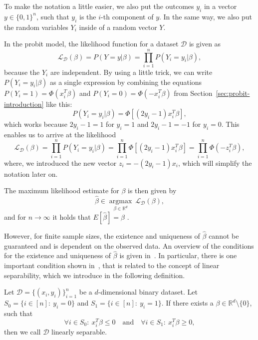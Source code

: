 To make the notation a little easier, we also put the outcomes $y_i$
in a vector $y \in \{0, 1\}^n$, such that $y_i$ is the $i$-th
component of $y$. In the same way, we also put the random
variables $Y_i$ inside of a random vector $Y$.

In the probit model, the likelihood function for a
dataset $\mathcal{D}$ is given as
\begin{equation}
    \label{eq:likelihood}
    \mathcal{L}_\mathcal{D}(\beta) = P(Y=y | \beta) = \prod_{i=1}^n P(Y_i=y_i | \beta),
\end{equation}
because the $Y_i$ are independent. By using a little trick, we can
write $P(Y_i=y_i|\beta)$ as a single expression by combining
the equations $P(Y_i=1) = \Phi(x_i^T \beta)$ and
$P(Y_i=0) = \Phi(-x_i^T \beta)$ from Section~\ref{sec:probit-introduction}
like this:
\begin{equation*}
    P(Y_i = y_i | \beta) = \Phi[(2y_i - 1) x_i^T \beta],
\end{equation*}
which works because $2y_i-1=1$ for $y_i=1$ and $2y_i-1=-1$ for $y_i=0$.
This enables us to arrive at the likelihood
\begin{equation}
    \mathcal{L}_\mathcal{D}(\beta) = \prod_{i=1}^n P(Y_i=y_i | \beta)
    = \prod_{i=1}^n \Phi[(2y_i - 1) x_i^T \beta]
    = \prod_{i=1}^n \Phi(- z_i^T \beta),
\end{equation}
where, we introduced the new vector $z_i = - (2y_i - 1) x_i$, which will
simplify the notation later on.

The maximum likelihood estimate for $\beta$ is then given by
\begin{equation}
    \label{eq:maximum-likelihood-estimate}
    \hat{\beta} \in \underset{\beta \in \mathbb{R}^d}{\operatorname{argmax}}\
    \mathcal{L}_\mathcal{D}(\beta),
\end{equation}
and for $n \rightarrow \infty$ it holds that
$E[\hat{\beta}] = \beta$ \cite{regression-fahrmeir}.

However, for finite sample sizes, the existence and
uniqueness of $\hat{\beta}$
cannot be guaranteed and is dependent on the observed data.
An overview of the conditions for the existence and uniqueness of
$\hat{\beta}$ is given in~\cite{probit-computational}.
In particular, there is one important condition shown
in~\cite{probit-existence}, that is related to the concept of
linear separability, which we introduce in the following definition.
\begin{definition}
    \label{def:linear-separability}
    Let $\mathcal{D}=\{(x_i, y_i)\}_{i=1}^n$ be a $d$-dimensional
    binary dataset.
    Let $S_0 = \{i \in [n]:\ y_i = 0\}$ and $S_1 = \{i \in [n]:\ y_i = 1\}$.
    If there exists a $\beta \in \mathbb{R}^d \setminus \{0\}$, such that
    \begin{equation*}
        \forall i \in S_0:\ x_i^T \beta \leq 0\quad \text{and}\quad \forall i \in S_1:\ x_i^T \beta \geq 0,
    \end{equation*}
    then we call $\mathcal{D}$ linearly separable.
\end{definition}

